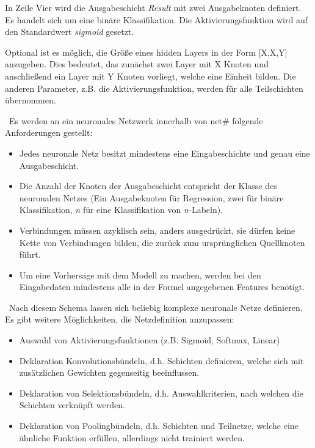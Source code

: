 In Zeile Vier wird die Ausgabeschicht \textit{Result} mit zwei Ausgabeknoten definiert. Es handelt sich um eine binäre Klassifikation. Die Aktivierungsfunktion wird auf den Standardwert \textit{sigmoid} gesetzt. 

Optional ist es möglich, die Größe eines hidden Layers in der Form [X,X,Y] anzugeben. Dies bedeutet, das zunächst zwei Layer mit X Knoten und anschließend ein Layer mit Y Knoten vorliegt, welche eine Einheit bilden. Die anderen Parameter, z.B. die Aktivierungsfunktion, werden für alle Teilschichten übernommen.

~\newline Es werden an ein neuronales Netzwerk innerhalb von net\# folgende Anforderungen gestellt:

\begin{itemize}
	\item Jedes neuronale Netz besitzt mindestens eine Eingabeschichte und genau eine Ausgabeschicht.
	\item Die Anzahl der Knoten der Ausgabeschicht entspricht der Klasse des neuronalen Netzes (Ein Ausgabeknoten für Regression, zwei für binäre Klassifikation, \textit{n} für eine Klassifikation von \textit{n-}Labeln).
	\item Verbindungen müssen azyklisch sein, anders ausgedrückt, sie dürfen keine Kette von Verbindungen bilden, die zurück zum ursprünglichen Quellknoten führt.
	\item Um eine Vorhersage mit dem Modell zu machen, werden bei den Eingabedaten mindestens alle in der Formel angegebenen Features benötigt. 
\end{itemize}

~\newline Nach diesem Schema lassen sich beliebig komplexe neuronale Netze definieren. Es gibt weitere Möglichkeiten, die Netzdefinition anzupassen:

\begin{itemize}
	\item Auswahl von Aktivierungsfunktionen (z.B. Sigmoid, Softmax, Linear)
	\item Deklaration Konvolutionsbündeln, d.h. Schichten definieren, welche sich mit zusätzlichen Gewichten gegenseitig beeinflussen.
	\item Deklaration von Selektionsbündeln, d.h. Auswahlkriterien, nach welchen die Schichten verknüpft werden.
	\item Deklaration von Poolingbündeln, d.h. Schichten und Teilnetze, welche eine ähnliche Funktion erfüllen, allerdings nicht trainiert werden. 
\end{itemize} 

